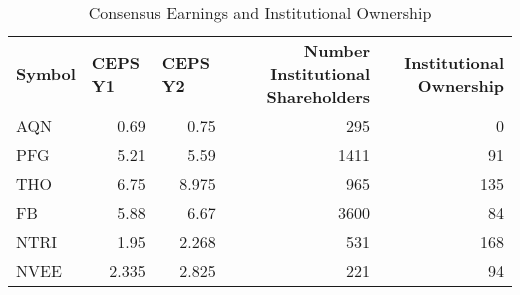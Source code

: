 \documentclass{article}
\begin{document}
\begin{table}[htbp]
  \caption{Consensus Earnings and Institutional Ownership}
    \begin{tabular}{lrrrr}
    \textbf{Symbol} & \multicolumn{1}{l}{\textbf{CEPS Y1}} & \multicolumn{1}{l}{\textbf{CEPS Y2}} & \multicolumn{1}{p{4.215em}}{\textbf{Number Institutional Shareholders}} & \multicolumn{1}{p{4.215em}}{\textbf{Institutional Ownership}} \\
    AQN   & 0.69  & 0.75  & 295   & 0 \\
    PFG   & 5.21  & 5.59  & 1411  & 91 \\
    THO   & 6.75  & 8.975 & 965   & 135 \\
    FB    & 5.88  & 6.67  & 3600  & 84 \\
    NTRI  & 1.95  & 2.268 & 531   & 168 \\
    NVEE  & 2.335 & 2.825 & 221   & 94 \\
    \end{tabular}%
  \label{tab:addlabel}%
\end{table}%
\end{document}
